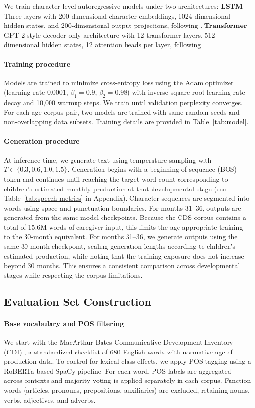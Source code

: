 We train character-level autoregressive models under two architectures: \textbf{LSTM} Three layers with 200-dimensional character embeddings, 1024-dimensional hidden states, and 200-dimensional output projections, following \citet{lavechin2023babyslm}. \textbf{Transformer} GPT-2-style decoder-only architecture with 12 transformer layers, 512-dimensional hidden states, 12 attention heads per layer, following \citet{goriely2024babble}. 


\paragraph{Training procedure} Models are trained to minimize cross-entropy loss using the Adam optimizer (learning rate 0.0001, $\beta_1=0.9$, $\beta_2=0.98$) with inverse square root learning rate decay and 10,000 warmup steps. We train until validation perplexity converges. For each age-corpus pair, two models are trained with same random seeds and non-overlapping data subsets. Training details are provided in Table~\ref{tab:model}.


\paragraph{Generation procedure} At inference time, we generate text using temperature sampling with $T \in \{0.3, 0.6, 1.0, 1.5\}$. Generation begins with a beginning-of-sequence (BOS) token and continues until reaching the target word count corresponding to children's estimated monthly production at that developmental stage (see Table~\ref{tab:speech-metrics} in Appendix). Character sequences are segmented into words using space and punctuation boundaries. For months 31–36, outputs are generated from the same model checkpoints. Because the CDS corpus contains a total of 15.6M words of caregiver input, this limits the age-appropriate training to the 30-month equivalent. For months 31–36, we generate outputs using the same 30-month checkpoint, scaling generation lengths according to children’s estimated production, while noting that the training exposure does not increase beyond 30 months. This ensures a consistent comparison across developmental stages while respecting the corpus limitations.


\subsection{Evaluation Set Construction} \label{sec:eval_construction}
\paragraph{Base vocabulary and POS filtering} We start with the MacArthur-Bates Communicative Development Inventory (CDI) \citep{fenson2007macarthur}, a standardized checklist of 680 English words with normative age-of-production data. To control for lexical class effects, we apply POS tagging using a RoBERTa-based SpaCy pipeline. For each word, POS labels are aggregated across contexts and majority voting is applied separately in each corpus. Function words (articles, pronouns, prepositions, auxiliaries) are excluded, retaining nouns, verbs, adjectives, and adverbs.

